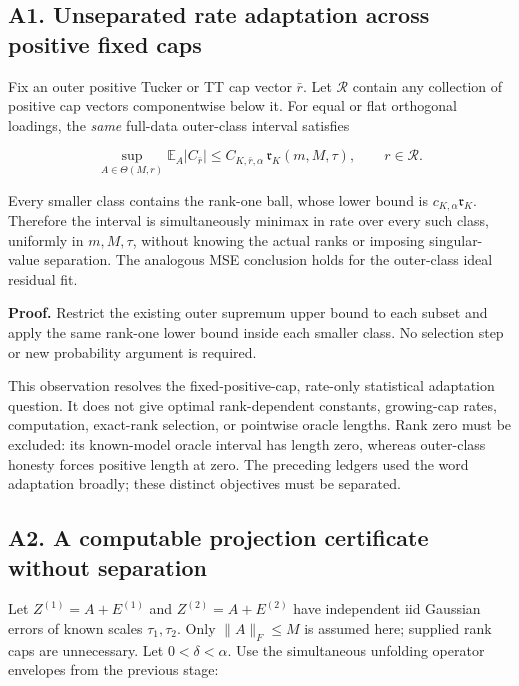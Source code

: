 \documentclass[
  10pt,
]{article}
\begin{document}
\subsection{A1. Unseparated rate adaptation across positive fixed
caps}\label{a1.-unseparated-rate-adaptation-across-positive-fixed-caps}

Fix an outer positive Tucker or TT cap vector \(\bar r\). Let
\(\mathcal R\) contain any collection of positive cap vectors
componentwise below it. For equal or flat orthogonal loadings, the
\emph{same} full-data outer-class interval satisfies

\[\sup_{A\in\Theta(M,r)}\mathbb E_A|C_{\bar r}|
\le C_{K,\bar r,\alpha}\,\mathfrak r_K(m,M,\tau),\qquad r\in\mathcal R.\]

Every smaller class contains the rank-one ball, whose lower bound is
\(c_{K,\alpha}\mathfrak r_K\). Therefore the interval is simultaneously
minimax in rate over every such class, uniformly in \(m,M,\tau\),
without knowing the actual ranks or imposing singular-value separation.
The analogous MSE conclusion holds for the outer-class ideal residual
fit.

\textbf{Proof.} Restrict the existing outer supremum upper bound to each
subset and apply the same rank-one lower bound inside each smaller
class. No selection step or new probability argument is required.

This observation resolves the fixed-positive-cap, rate-only statistical
adaptation question. It does not give optimal rank-dependent constants,
growing-cap rates, computation, exact-rank selection, or pointwise
oracle lengths. Rank zero must be excluded: its known-model oracle
interval has length zero, whereas outer-class honesty forces positive
length at zero. The preceding ledgers used the word adaptation broadly;
these distinct objectives must be separated.

\subsection{A2. A computable projection certificate without
separation}\label{a2.-a-computable-projection-certificate-without-separation}

Let \(Z^{(1)}=A+E^{(1)}\) and \(Z^{(2)}=A+E^{(2)}\) have independent iid
Gaussian errors of known scales \(\tau_1,\tau_2\). Only \(\|A\|_F\le M\)
is assumed here; supplied rank caps are unnecessary. Let
\(0<\delta<\alpha\). Use the simultaneous unfolding operator envelopes
from the previous stage:
\end{document}
